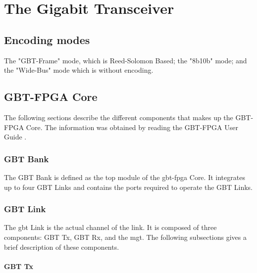 \documentclass[main.tex]{subfiles}
\begin{document}




\chapter{The Gigabit Transceiver} \label{chap:gbt}


\section{Encoding modes}

The "GBT-Frame" mode, which is Reed-Solomon Based; the "8b10b" mode; and the "Wide-Bus" mode which is without encoding.

\section{GBT-FPGA Core}
The following sections describe the different components that makes up the GBT-FPGA Core. The information was obtained by reading the GBT-FPGA User Guide \cite{gbt_fpga}.

\subsection{GBT Bank}
The GBT Bank is defined as the top module of the \gls{gbt}-\gls{fpga} Core. It integrates up to four GBT Links and contains the ports required to operate the GBT Links.

\subsection{GBT Link}
The \gls{gbt} Link is the actual channel of the link. It is composed of three components: GBT Tx, GBT Rx, and the \gls{mgt}. The following subsections gives a brief description of these components.

\subsubsection{GBT Tx}
\end{document}
